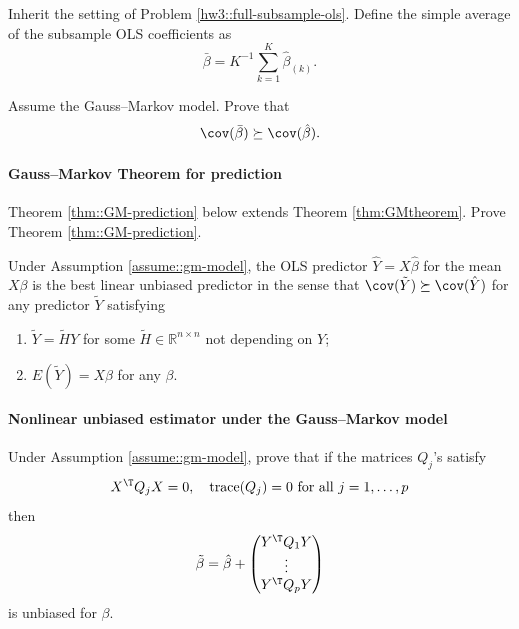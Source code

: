  Inherit the setting of Problem \ref{hw3::full-subsample-ols}. Define the simple average of the subsample OLS coefficients as 
 $$
 \bar{\beta} = K^{-1}\sum_{k=1}^{K} \hat{\beta}_{(k)}.
 $$ 
 
 Assume the Gauss--Markov model. 
  Prove that 
 $$
\cov(\bar{\beta}) \succeq \cov(\hat{\beta}).
$$


 
 \paragraph{Gauss--Markov Theorem for prediction}\label{hw4::gaussmarkov-prediction}


Theorem \ref{thm::GM-prediction} below extends Theorem \ref{thm:GMtheorem}. Prove Theorem \ref{thm::GM-prediction}.


\begin{theorem}
\label{thm::GM-prediction}
Under Assumption \ref{assume::gm-model}, the OLS predictor 
$\hat{Y}=X\hat{\beta}$ for the mean $X\beta$ is the best linear unbiased predictor in the sense that $\cov(\tilde{Y}) \succeq \cov( \hat{Y} )$
for any predictor $\tilde{Y}$ satisfying 
\begin{enumerate}[label=(\textup{C}\arabic*), ref=\textup{C}\arabic*]
\item\label{item::gm-linear-pred} $\tilde{Y}=\tilde{H}Y$ for some $ \tilde{H} \in\mathbb{R}^{n \times n}$ not depending
on $Y$;
\item\label{item::gm-unbiased-pred} $E ( \tilde{Y} ) = X \beta$   for any $\beta$. 
\end{enumerate}
\end{theorem}

 
 






\paragraph{Nonlinear unbiased estimator under the Gauss--Markov model}
\label{hw4::nonlinear-unbiased-underGM}

Under Assumption \ref{assume::gm-model}, prove that if the matrices $Q_j$'s satisfy  
\begin{equation}
\label{eg::quadratic-GM}
X^{\T} Q_j X = 0
,\quad 
\text{trace}(Q_j) = 0  \text{ for all } j=1,\ldots, p
\end{equation}
then
$$
\tilde\beta = \hat\beta + \begin{pmatrix}
Y^{\T} Q_1 Y \\
\vdots \\
Y^{\T} Q_p Y 
\end{pmatrix}
$$
is unbiased for $\beta$. 


